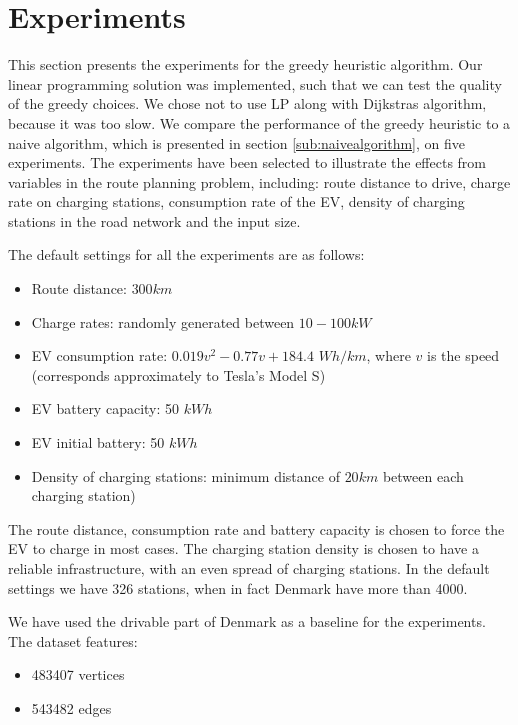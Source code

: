 \section{Experiments}
\label{sec:experiments}
This section presents the experiments for the greedy heuristic algorithm. Our linear programming solution was implemented, such that we can test the quality of the greedy choices. We chose not to use LP along with Dijkstras algorithm, because it was too slow. We compare the performance of the greedy heuristic to a naive algorithm, which is presented in section \ref{sub:naivealgorithm}, on five experiments. The experiments have been selected to illustrate the effects from variables in the route planning problem, including: route distance to drive, charge rate on charging stations, consumption rate of the EV, density of charging stations in the road network and the input size.

The default settings for all the experiments are as follows:
\begin{itemize}
     \item Route distance: $300 \si{km}$
     \item Charge rates: randomly generated between $10-100 \si{kW}$
     \item EV consumption rate: $0.019v^2-0.77v+184.4$ $\si{Wh\per km}$, where $v$ is the speed (corresponds approximately to Tesla's Model S\cite{teslacon})
     \item EV battery capacity: 50 $\si{kWh}$
	 \item EV initial battery: 50 $\si{kWh}$
     \item Density of charging stations: minimum distance of $20 \si{km}$ between each charging station)
 \end{itemize} 

The route distance, consumption rate and battery capacity is chosen to force the EV to charge in most cases. The charging station density is chosen to have a reliable infrastructure, with an even spread of charging stations. In the default settings we have 326 stations, when in fact Denmark have more than 4000\cite{Globalevoutlook}. 

We have used the drivable part of Denmark as a baseline for the experiments. The dataset features:
\begin{itemize}
    \item 483407 vertices
    \item 543482 edges
\end{itemize}




















